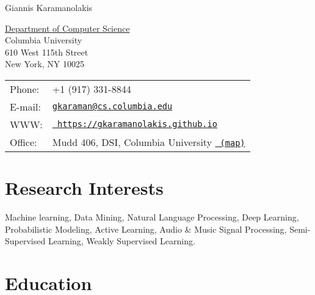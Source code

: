 \documentclass[letterpaper]{article}
\def\name{Giannis Karamanolakis}
\renewenvironment{itemize}{
  \begin{list}{}{
    \setlength{\leftmargin}{1.5em}
  }
}{
  \end{list}
}
\begin{document}



{\huge \name}


\vspace{0.25in}

\begin{minipage}{0.45\linewidth}
  \href{http://www.cs.columbia.edu/}{Department of Computer Science} \\
  Columbia University \\
  610 West 115th Street\\
  New York, NY 10025
\end{minipage}
\begin{minipage}{0.45\linewidth}
  \begin{tabular}{ll}
    Phone: & +1 (917) 331-8844 \\
    E-mail: & \href{mailto:gkaraman@cs.columbia.edu}{\tt gkaraman@cs.columbia.edu} \\
    WWW: & \href{https://gkaramanolakis.github.io}{\tt
    https://gkaramanolakis.github.io} \\
    Office: & Mudd 406, DSI, Columbia University \href{https://goo.gl/maps/CsUb6tbN69L2}{\tt
    (map)}
  \end{tabular}
\end{minipage}


\section*{Research Interests}

\begin{itemize}
  \item Machine learning, Data Mining, Natural Language Processing, Deep Learning, Probabilistic Modeling, Active Learning, Audio \& Music Signal Processing, Semi-Supervised Learning, Weakly Supervised Learning.
\end{itemize}

\section*{Education}
\end{document}
